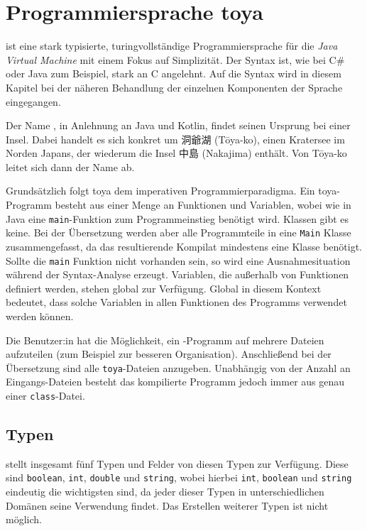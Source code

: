 \chapter{Programmiersprache toya}
\label{cha:toya}

\toya ist eine stark typisierte, turing\-vollständige Programmiersprache für die \textit{Java Virtual Machine} mit einem Fokus auf Simplizität. Der Syntax ist, wie bei C\# oder Java zum Beispiel, stark an C angelehnt. Auf die Syntax wird in diesem Kapitel bei der näheren Behandlung der einzelnen Komponenten der Sprache eingegangen. 

\begin{CJK}{UTF8}{ipxm}
Der Name \toya, in Anlehnung an Java und Kotlin, findet seinen Ursprung bei einer Insel. Dabei handelt es sich konkret um 洞爺湖 (Tōya-ko), einen Kratersee im Norden Japans, der wiederum die Insel 中島 (Nakajima) enthält. Von Tōya-ko leitet sich dann der Name \toya ab.
\end{CJK}

Grundsätzlich folgt toya dem imperativen Programmierparadigma. Ein toya-Programm besteht aus einer Menge an Funktionen und Variablen, wobei wie in Java eine \texttt{main}-Funktion zum Programmeinstieg benötigt wird. Klassen gibt es keine. Bei der Übersetzung werden aber alle Programmteile in eine \texttt{Main} Klasse zusammengefasst, da das resultierende Kompilat mindestens eine Klasse benötigt. Sollte die \texttt{main} Funktion nicht vorhanden sein, so wird eine Ausnahmesituation während der Syntax-Analyse erzeugt. Variablen, die außerhalb von Funktionen definiert werden, stehen global zur Verfügung. Global in diesem Kontext bedeutet, dass solche Variablen in allen Funktionen des Programms verwendet werden können.

Die Benutzer:in hat die Möglichkeit, ein \toya-Programm auf mehrere Dateien aufzuteilen (zum Beispiel zur besseren Organisation). Anschließend bei der Übersetzung sind alle \texttt{toya}-Dateien anzugeben. Unabhängig von der Anzahl an Eingangs-Dateien besteht das kompilierte Programm jedoch immer aus genau einer \texttt{class}-Datei.  

\section{Typen}

\toya stellt insgesamt fünf Typen und Felder von diesen Typen zur Verfügung. Diese sind \texttt{boolean}, \texttt{int}, \texttt{double} und \texttt{string}, wobei hierbei \texttt{int}, \texttt{boolean} und \texttt{string} eindeutig die wichtigsten sind, da jeder dieser Typen in unterschiedlichen Domänen seine Verwendung findet. Das Erstellen weiterer Typen ist nicht möglich.

